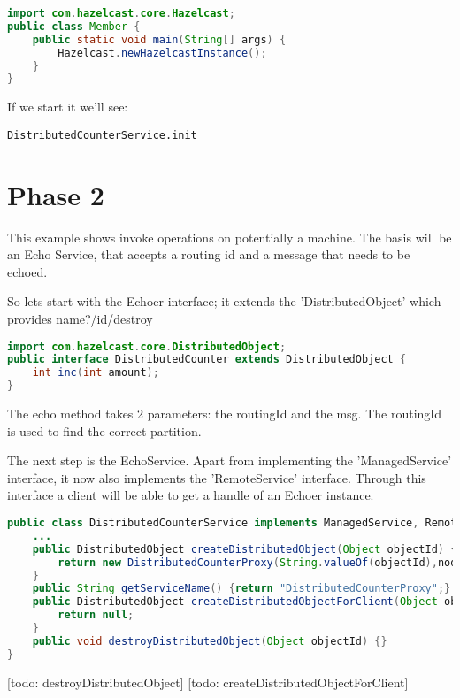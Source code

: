\begin{lstlisting}[language=java]
import com.hazelcast.core.Hazelcast;
public class Member {
    public static void main(String[] args) {
        Hazelcast.newHazelcastInstance();
    }
}
\end{lstlisting}
If we start it we'll see:
\begin{lstlisting}
DistributedCounterService.init
\end{lstlisting}

\section{Phase 2}
This example shows invoke operations on potentially a machine. The basis will be an Echo Service, that accepts a routing id and a message that needs to be echoed.

So lets start with the Echoer interface; it extends the 'DistributedObject' which provides name?/id/destroy
\begin{lstlisting}[language=java]
import com.hazelcast.core.DistributedObject;
public interface DistributedCounter extends DistributedObject {
    int inc(int amount);
}
\end{lstlisting}
The echo method takes 2 parameters: the routingId and the msg. The routingId is used to find the correct partition. 

The next step is the EchoService. Apart from implementing the 'ManagedService' interface, it now also implements the 'RemoteService' interface. Through this interface a client will be able to get a handle of an Echoer instance.
\begin{lstlisting}[language=java]
public class DistributedCounterService implements ManagedService, RemoteService {
    ...  
    public DistributedObject createDistributedObject(Object objectId) {
        return new DistributedCounterProxy(String.valueOf(objectId),nodeEngine);
    }
    public String getServiceName() {return "DistributedCounterProxy";}
    public DistributedObject createDistributedObjectForClient(Object objectId) {
        return null;
    }
    public void destroyDistributedObject(Object objectId) {}
}
\end{lstlisting}
[todo: destroyDistributedObject]
[todo: createDistributedObjectForClient]

